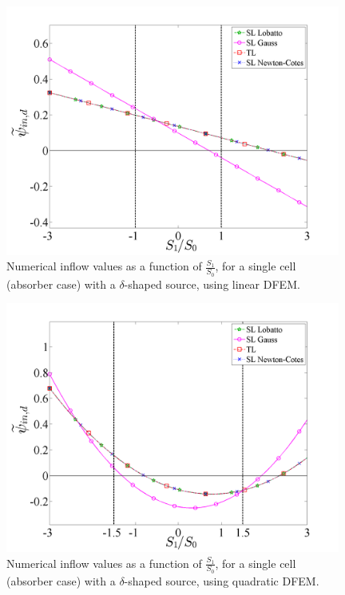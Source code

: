 \begin{figure}[!htp]
\centering
\includegraphics[width=11cm]{chapter2_constant_xs/Final_Inflow_RHS_Comparison_Source_P1_MFP_5.png}
\caption{Numerical inflow values  as a function of $\frac{S_1}{S_0}$, for a single cell (absorber case) with a $\delta$-shaped source, using linear DFEM.}
\label{fig:abs_inflow_p1}
\end{figure}
\begin{figure}[!hbp]
\centering
\includegraphics[width=11cm]{chapter2_constant_xs/Final_Inflow_RHS_Comparison_Source_P2_MFP_5.png}
\caption{Numerical inflow values  as a function of $\frac{S_1}{S_0}$, for a single cell (absorber case) with a $\delta$-shaped source, using quadratic DFEM.}
\label{fig:abs_inflow_p2}
\end{figure}
